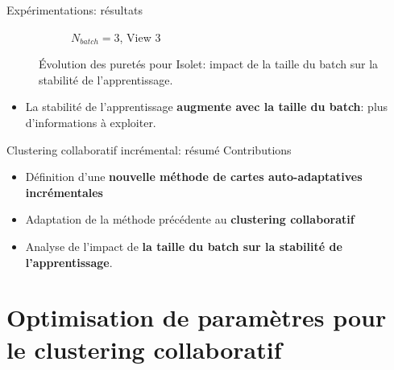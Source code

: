 \documentclass[hyperref={pdfpagelabels=false}]{beamer}
\begin{document}
\begin{frame}{Expérimentations: résultats}
\begin{figure}[!h]
\begin{subfigure}[b]{0.3\textwidth}
                    \caption{$N_{batch}=3$, View 3}
                \end{subfigure}
                \caption{Évolution des puretés pour Isolet: impact de la taille 
                du batch sur la stabilité de l'apprentissage.}
            \end{figure}
            \begin{itemize}
                \item La stabilité de l'apprentissage \textbf{augmente avec la 
                    taille du batch}: plus d'informations à exploiter.
            \end{itemize}
        \end{frame}

        \begin{frame}{Clustering collaboratif incrémental: résumé}
            Contributions
            \begin{itemize}
                \item Définition d'une \textbf{nouvelle méthode de cartes
                    auto-adaptatives incrémentales}
                \item Adaptation de la méthode précédente au \textbf{clustering
                    collaboratif}
                \item Analyse de l'impact de \textbf{la taille du batch sur la 
                    stabilité de l'apprentissage}.
            \end{itemize}

            \begin{center}
                \fontsize{14pt}{15pt}
            \end{center}
        \end{frame}

    \section{Optimisation de paramètres pour le clustering collaboratif}
\end{document}
